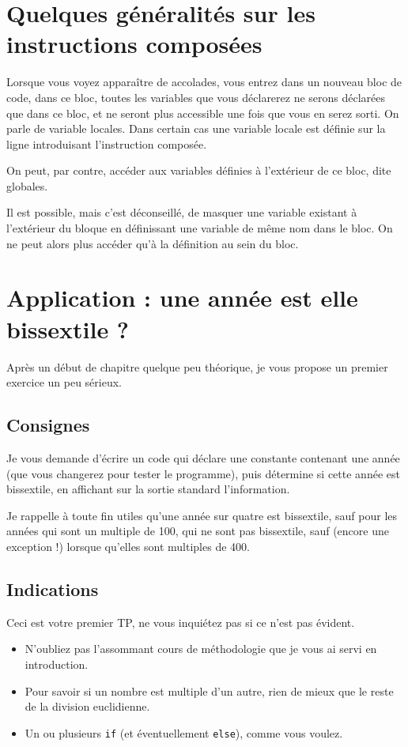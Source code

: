 \section{Quelques généralités sur les instructions composées}
Lorsque vous voyez apparaître de accolades, vous entrez dans un nouveau bloc de code, dans ce bloc, toutes les variables que vous déclarerez ne serons déclarées que dans ce bloc, et ne seront plus accessible une fois que vous en serez sorti. On parle de variable locales. Dans certain cas une variable locale est définie sur la ligne introduisant l'instruction composée.

On peut, par contre, accéder aux variables définies à l'extérieur de ce bloc, dite globales.

Il est possible, mais c'est déconseillé, de masquer une variable existant à l'extérieur du bloque en définissant une variable de même nom dans le bloc. On ne peut alors plus accéder qu'à la définition au sein du bloc.
\section{Application : une année est elle bissextile ?}
Après un début de chapitre quelque peu théorique, je vous propose un premier exercice un peu sérieux.
\subsection{Consignes}
Je vous demande d'écrire un code qui déclare une constante contenant une année
(que vous changerez pour tester le programme),
puis détermine si cette année est bissextile,
en affichant sur la sortie standard l'information.

Je rappelle à toute fin utiles qu'une année sur quatre est bissextile,
sauf pour les années qui sont un multiple de 100, qui ne sont pas bissextile,
sauf (encore une exception !) lorsque qu'elles sont multiples de 400.
\subsection{Indications}

Ceci est votre premier TP, ne vous inquiétez pas si ce n'est pas évident.

\begin{itemize}

\item N'oubliez pas l'assommant cours de méthodologie que je vous ai servi en introduction.

\item Pour savoir si un nombre est multiple d'un autre,
rien de mieux que le reste de la division euclidienne.

\item Un ou plusieurs \texttt{if} (et éventuellement \texttt{else}), comme vous voulez.
\end{itemize}
\pagebreak %
